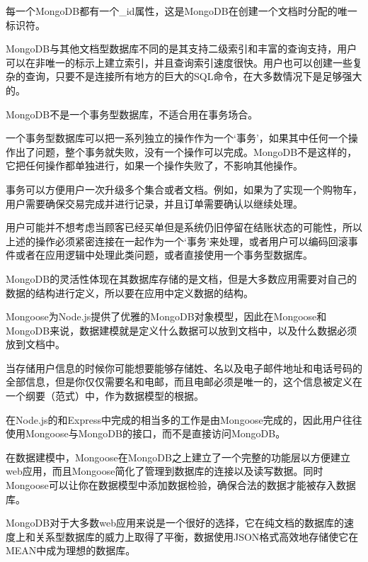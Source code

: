 每一个MongoDB都有一个\_id属性，这是MongoDB在创建一个文档时分配的唯一标识符。

MongoDB与其他文档型数据库不同的是其支持二级索引和丰富的查询支持，用户可以在非唯一的标示上建立索引，并且查询索引速度很快。用户也可以创建一些复杂的查询，只要不是连接所有地方的巨大的SQL命令，在大多数情况下是足够强大的。

MongoDB不是一个事务型数据库，不适合用在事务场合。

一个事务型数据库可以把一系列独立的操作作为一个‘事务’，如果其中任何一个操作出了问题，整个事务就失败，没有一个操作可以完成。MongoDB不是这样的，它把任何操作都单独进行，如果一个操作失败了，不影响其他操作。

事务可以方便用户一次升级多个集合或者文档。例如，如果为了实现一个购物车，用户需要确保交易完成并进行记录，并且订单需要确认以继续处理。

用户可能并不想考虑当顾客已经买单但是系统仍旧停留在结账状态的可能性，所以上述的操作必须紧密连接在一起作为一个‘事务’来处理，或者用户可以编码回滚事件或者在应用逻辑中处理此类问题，或者直接使用一个事务型数据库。

MongoDB的灵活性体现在其数据库存储的是文档，但是大多数应用需要对自己的数据的结构进行定义，所以要在应用中定义数据的结构。

Mongoose为Node.js提供了优雅的MongoDB对象模型，因此在Mongoose和MongoDB来说，数据建模就是定义什么数据可以放到文档中，以及什么数据必须放到文档中。



当存储用户信息的时候你可能想要能够存储姓、名以及电子邮件地址和电话号码的全部信息，但是你仅仅需要名和电邮，而且电邮必须是唯一的，这个信息被定义在一个纲要（范式）中，作为数据模型的根据。


在Node.js的和Express中完成的相当多的工作是由Mongoose完成的，因此用户往往使用Mongoose与MongoDB的接口，而不是直接访问MongoDB。

在数据建模中，Mongoose在MongoDB之上建立了一个完整的功能层以方便建立web应用，而且Mongoose简化了管理到数据库的连接以及读写数据。同时Mongoose可以让你在数据模型中添加数据检验，确保合法的数据才能被存入数据库。

MongoDB对于大多数web应用来说是一个很好的选择，它在纯文档的数据库的速度上和关系型数据库的威力上取得了平衡，数据使用JSON格式高效地存储使它在MEAN中成为理想的数据库。




\begin{lstlisting}[language=JavaScript]

\end{lstlisting}






